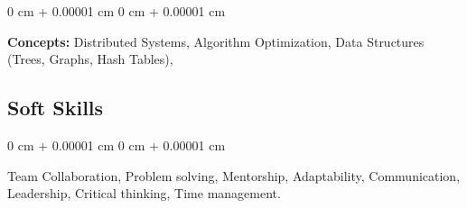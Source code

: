 \documentclass[10pt, letterpaper]{article}
\newenvironment{onecolentry}{
    \begin{adjustwidth}{
        0 cm + 0.00001 cm
    }{
        0 cm + 0.00001 cm
    }
}{
    \end{adjustwidth}
} %
\begin{document}
\vspace{0.1 cm}

\begin{onecolentry}
    \textbf{Concepts:} Distributed Systems, Algorithm Optimization, Data Structures (Trees, Graphs, Hash Tables),
\end{onecolentry}

\subsection*{Soft Skills}
\begin{onecolentry}
    Team Collaboration, Problem solving, Mentorship, Adaptability, Communication, Leadership, Critical thinking, Time management.
\end{onecolentry}
\end{document}
